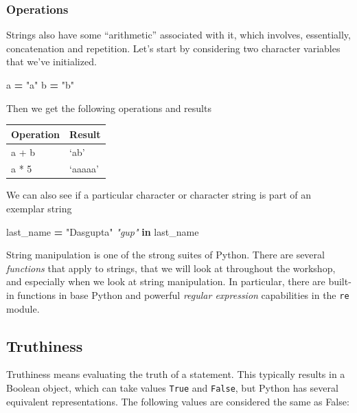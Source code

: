 \documentclass[
  letterpaper,
]{scrbook}
\newenvironment{Shaded}{\begin{snugshade}}{\end{snugshade}}
\newcommand{\CommentTok}[1]{\textcolor[rgb]{0.56,0.35,0.01}{\textit{#1}}}
\newcommand{\KeywordTok}[1]{\textcolor[rgb]{0.13,0.29,0.53}{\textbf{#1}}}
\newcommand{\NormalTok}[1]{#1}
\newcommand{\OperatorTok}[1]{\textcolor[rgb]{0.81,0.36,0.00}{\textbf{#1}}}
\newcommand{\StringTok}[1]{\textcolor[rgb]{0.31,0.60,0.02}{#1}}
\begin{document}
\hypertarget{operations}{%
\subsubsection{Operations}\label{operations}}

Strings also have some ``arithmetic'' associated with it, which involves, essentially, concatenation and repetition. Let's start by considering two character variables that we've initialized.

\begin{Shaded}
\begin{Highlighting}[]
\NormalTok{a }\OperatorTok{=} \StringTok{"a"}
\NormalTok{b }\OperatorTok{=} \StringTok{"b"}
\end{Highlighting}
\end{Shaded}

Then we get the following operations and results

\begin{longtable}[]{@{}ll@{}}
\toprule
Operation & Result\tabularnewline
\midrule
\endhead
a + b & `ab'\tabularnewline
a * 5 & `aaaaa'\tabularnewline
\bottomrule
\end{longtable}

We can also see if a particular character or character string is part of an exemplar string

\begin{Shaded}
\begin{Highlighting}[]
\NormalTok{last\_name }\OperatorTok{=} \StringTok{"Dasgupta"}
\CommentTok{"gup"} \KeywordTok{in}\NormalTok{ last\_name}
\end{Highlighting}
\end{Shaded}

String manipulation is one of the strong suites of Python.
There are several \emph{functions} that apply to strings, that we will look at throughout the workshop, and especially when we look at string manipulation. In particular, there are built-in functions in base Python and powerful \emph{regular expression} capabilities in the \texttt{re} module.

\hypertarget{truthiness}{%
\subsection{Truthiness}\label{truthiness}}

Truthiness means evaluating the truth of a statement. This typically results in a Boolean object, which can take values \texttt{True} and \texttt{False}, but Python has several equivalent representations. The following values are considered the same as False:
\end{document}
